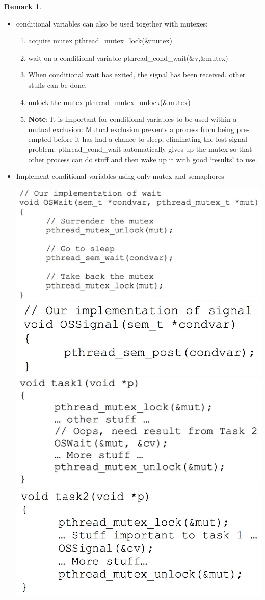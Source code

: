 \documentclass[11pt,a4paper]{article}
\theoremstyle{definition}
\newtheorem*{remark}{Remark}
\newenvironment{myitemize}
{ \begin{itemize}
    \setlength{\itemsep}{5pt}
    \setlength{\parskip}{0pt}
    \setlength{\parsep}{0pt}     }
{ \end{itemize}                  }
\newenvironment{myenumerate}
{ \begin{enumerate}
    \setlength{\itemsep}{5pt}
    \setlength{\parskip}{0pt}
    \setlength{\parsep}{0pt}     }
{ \end{enumerate}                }
\begin{document}
\begin{remark}
	\begin{myitemize}
		\item conditional variables can also be used together with mutexes:
		\begin{myenumerate}
			\item acquire mutex \textsf{pthread\_mutex\_lock(\&mutex)}
			\item wait on a conditional variable \textsf{pthread\_cond\_wait(\&v,\&mutex)}
			\item When conditional wait has exited, the signal has been received, other stuffs can be done.
			\item unlock the mutex \textsf{pthread\_mutex\_unlock(\&mutex)}
			\item \textbf{Note}: It is important for conditional variables to be used within a mutual exclusion: Mutual exclusion prevents a process from being pre-empted before it has had a chance to sleep, eliminating the lost-signal problem. \textsf{pthread\_cond\_wait} automatically gives up the mutex so that other process can do stuff and then wake up it with good `results' to use.
		\end{myenumerate}
		\item Implement conditional variables using only mutex and semaphores

		\includegraphics[width=.5\linewidth]{m1/ImplementCONDVARWithMutexSem1}
		\includegraphics[width=.5\linewidth]{m1/ImplementCONDVARWithMutexSem2}
		\includegraphics[width=.5\linewidth]{m1/ImplementCONDVARWithMutexSem3}
		\includegraphics[width=.5\linewidth]{m1/ImplementCONDVARWithMutexSem4}
	\end{myitemize}
\end{remark}
\end{document}
